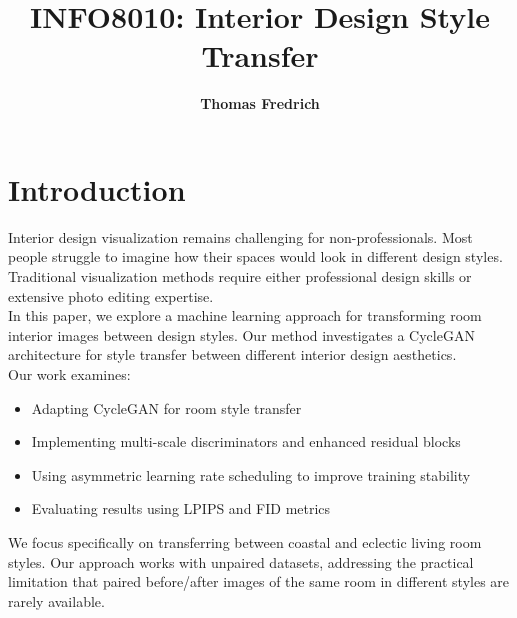 \documentclass[twocolumn,superscriptaddress,aps]{revtex4-1}
\begin{document}

\title{\Large{INFO8010: Interior Design Style Transfer}}
\vspace{1cm}
\author{\small{\bf Thomas Fredrich}}


\maketitle


\section{Introduction}

Interior design visualization remains challenging for non-professionals. Most people struggle to imagine how their spaces would look in different design styles. Traditional visualization methods require either professional design skills or extensive photo editing expertise.\\

In this paper, we explore a machine learning approach for transforming room interior images between design styles. Our method investigates a CycleGAN architecture for style transfer between different interior design aesthetics.\\

Our work examines:

\begin{itemize}
    \item Adapting CycleGAN for room style transfer
    \item Implementing multi-scale discriminators and enhanced residual blocks 
    \item Using asymmetric learning rate scheduling to improve training stability
    \item Evaluating results using LPIPS and FID metrics
\end{itemize}

We focus specifically on transferring between coastal and eclectic living room styles. Our approach works with unpaired datasets, addressing the practical limitation that paired before/after images of the same room in different styles are rarely available.
\end{document}
